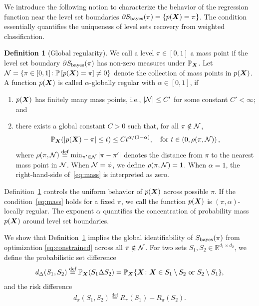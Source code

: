 \documentclass[11pt]{article}
\theoremstyle{plain}
\theoremstyle{definition}
\newtheorem{defn}{Definition}
\def\bayesS{S_{\textup{bayes}}}
\begin{document}
We introduce the following notion to characterize the behavior of the regression function near the level set boundaries $\partial S_{\text{bayes}}(\pi) = \{ p(\bm X)= \pi\}$. The condition essentially quantifies the uniqueness of level sets recovery from weighted classification.

\begin{defn} [Global regularity]\label{ass:decboundary}We call a level $\pi\in[0,1]$ a mass point if the level set boundary $\partial \bayesS(\pi)$ has non-zero measures under $\mathbb{P}_{\bm X}$. Let $\mathcal{N}=\{\pi\in[0,1] \colon \mathbb{P}\left[p(\bm X)=\pi\right]\neq 0\}$ denote the collection of mass points in $p(\bm X)$. A function $p(\bm X)$ is called $\alpha$-globally regular with $\alpha\in[0,1]$, if 
\begin{enumerate}[label=(\roman*),wide, labelwidth=!, labelindent=0pt,topsep=-5pt,itemsep=-1ex,partopsep=0ex,parsep=1ex]
\item $p(\bm X)$ has finitely many mass points, i.e., $|\mathcal{N}|\leq C'$ for some constant $C'<\infty$; and 
\item 
there exists a global constant $C>0$ such that, for all $\pi \notin \mathcal{N} $,
\begin{equation}\label{eq:mass}
\mathbb{P}_{\bm X}(|p(\bm X)-\pi|\leq t)\leq Ct^{\alpha/(1-\alpha)}, \quad \text{for }t\in \left(0,\rho(\pi,\mathcal{N})\right),
\end{equation}
where $\rho(\pi,\mathcal{N})\stackrel{\text{def}}{=}\min_{\pi'\in \mathcal{N}} |\pi-\pi'|$  denotes the distance from $\pi$ to the nearest mass point in $\mathcal{N}$. When $\mathcal{N} = \phi$, we define $\rho(\pi,\mathcal{N})=1$. When $\alpha=1$, the right-hand-side of~\eqref{eq:mass} is interpreted as zero.
\end{enumerate}
\end{defn}

Definition~\ref{ass:decboundary} controls the uniform behavior of $p(\bm X)$ across possible $\pi$. If the condition~\eqref{eq:mass} holds for a fixed $\pi$, we call the function $p(\bm X)$ is $(\pi,\alpha)$-locally regular. The exponent $\alpha$ quantifies the concentration of probability mass $p(\bm X)$ around level set boundaries.

We show that Definition~\ref{ass:decboundary} implies the global identifiability of $\bayesS(\pi)$ from optimization \eqref{eq:constrained} across all $\pi\notin \mathcal{N}$.
For two sets $S_1, S_2 \in \mathbb{R}^{d_1\times d_2}$, we define the probabilistic set difference 
\begin{align}\label{eq:riskdiff}
d_{\Delta}(S_1,S_2)\stackrel{\text{def}}{=}\mathbb{P}_{\bm X}(S_1\Delta S_2)=\mathbb{P}_{\bm X}\{\bm X\colon \bm X\in S_1\setminus S_2 \text{ or }S_2\setminus S_1\},
\end{align}
and the risk difference
\begin{align}\label{eq:setdiff}
d_\pi(S_1,S_2)\stackrel{\text{def}}{=} R_{\pi}(S_1)-R_{\pi}(S_2).
\end{align}
\end{document}
